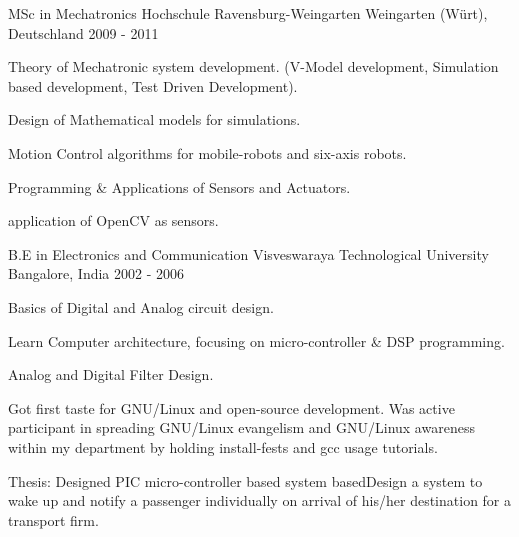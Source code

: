 

\begin{cventries}

  \cventry
    {MSc in Mechatronics} %
    {Hochschule Ravensburg-Weingarten} %
    {Weingarten (Würt), Deutschland} %
    {2009 - 2011} %
    {
      \begin{cvitems} %
        \item {Theory of Mechatronic system development. (V-Model development, Simulation based development, Test Driven Development).}
        \item {Design of Mathematical models for simulations.}
        \item {Motion Control algorithms for mobile-robots and six-axis robots.}
        \item {Programming \& Applications of Sensors and Actuators.}
        \item {application of OpenCV as sensors.}
      \end{cvitems}
    }


  \cventry
    {B.E in Electronics and Communication} %
    {Visveswaraya Technological University} %
    {Bangalore, India} %
    {2002 - 2006} %
    {
      \begin{cvitems} %
        \item {Basics of Digital and Analog circuit design.}
        \item {Learn Computer architecture, focusing on micro-controller \& DSP programming.}
        \item {Analog and Digital Filter Design.}
        \item {Got first taste for GNU/Linux and open-source development. Was active participant in spreading GNU/Linux evangelism and GNU/Linux awareness within my department by holding install-fests and gcc usage tutorials.}
        \item {Thesis: Designed PIC micro-controller based system basedDesign a system to wake up and notify a passenger individually on arrival of his/her destination for a transport firm.}
      \end{cvitems}
    }

\end{cventries}
